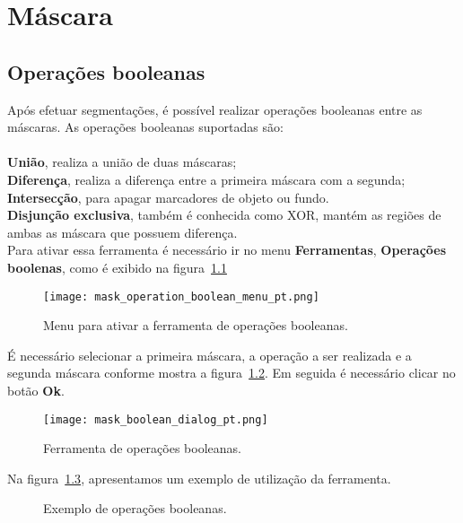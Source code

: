 \chapter{Máscara}


\section{Operações booleanas}

Após efetuar segmentações, é possível realizar operações booleanas entre as máscaras. As operações booleanas suportadas são:\\
\\
\textbf{União}, realiza a união de duas máscaras;\\
\textbf{Diferença}, realiza a diferença entre a primeira máscara com a segunda;\\
\textbf{Intersecção}, para apagar marcadores de objeto ou fundo.\\
\textbf{Disjunção exclusiva}, também é conhecida como XOR, mantém as regiões de ambas as máscara que possuem diferença.\\

Para ativar essa ferramenta é necessário ir no menu \textbf{Ferramentas}, \textbf{Operações boolenas}, como é exibido na figura~\ref{fig:booleano_menu} 

\begin{figure}[!htb]
\centering
\texttt{[image: mask\_operation\_boolean\_menu\_pt.png]}
\caption{Menu para ativar a ferramenta de operações booleanas.}
\label{fig:booleano_menu}
\end{figure}

É necessário selecionar a primeira máscara, a operação a ser realizada e a segunda máscara conforme mostra a figura~\ref{fig:booleano_janela}. Em seguida é necessário clicar no botão \textbf{Ok}.

\begin{figure}[!htb]
\centering
\texttt{[image: mask\_boolean\_dialog\_pt.png]}
\caption{Ferramenta de operações booleanas.}
\label{fig:booleano_janela}
\end{figure}

Na figura~\ref{fig:op_boolana}, apresentamos um exemplo de utilização da ferramenta.

\begin{figure}[!htb]
  \centering
  \hfill
  \hfill  
  \hfill  
  \hfill  
  \hfill  
  \caption{Exemplo de operações booleanas.}
  \label{fig:op_boolana}
\end{figure}

